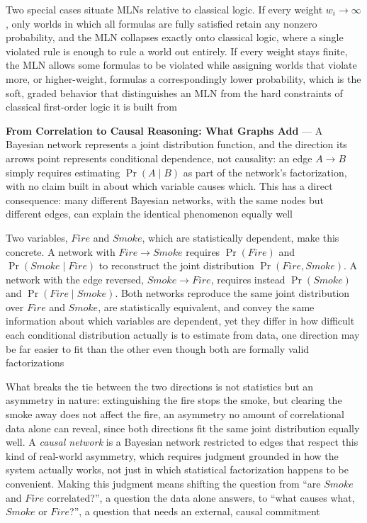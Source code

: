 Two special cases situate MLNs relative to classical logic. If every
weight $w_i \to \infty$, only worlds in which all formulas are fully
satisfied retain any nonzero probability, and the MLN collapses exactly
onto classical logic, where a single violated rule is enough to rule a
world out entirely. If every weight stays finite, the MLN allows some
formulas to be violated while assigning worlds that violate more, or
higher-weight, formulas a correspondingly lower probability, which is the
soft, graded behavior that distinguishes an MLN from the hard constraints
of classical first-order logic it is built from

\textbf{From Correlation to Causal Reasoning: What Graphs Add} --- A
Bayesian network represents a joint distribution function, and the
direction its arrows point represents conditional dependence, not
causality: an edge $A \to B$ simply requires estimating $\Pr(A \mid B)$ as
part of the network's factorization, with no claim built in about which
variable causes which. This has a direct consequence: many different
Bayesian networks, with the same nodes but different edges, can explain
the identical phenomenon equally well

Two variables, $Fire$ and $Smoke$, which are statistically dependent, make
this concrete. A network with $Fire \to Smoke$ requires $\Pr(Fire)$ and
$\Pr(Smoke \mid Fire)$ to reconstruct the joint distribution $\Pr(Fire,
Smoke)$. A network with the edge reversed, $Smoke \to Fire$, requires
instead $\Pr(Smoke)$ and $\Pr(Fire \mid Smoke)$. Both networks reproduce
the same joint distribution over $Fire$ and $Smoke$, are statistically
equivalent, and convey the same information about which variables are
dependent, yet they differ in how difficult each conditional distribution
actually is to estimate from data, one direction may be far easier to fit
than the other even though both are formally valid factorizations

What breaks the tie between the two directions is not statistics but an
asymmetry in nature: extinguishing the fire stops the smoke, but clearing
the smoke away does not affect the fire, an asymmetry no amount of
correlational data alone can reveal, since both directions fit the same
joint distribution equally well. A \emph{causal network} is a Bayesian
network restricted to edges that respect this kind of real-world asymmetry,
which requires judgment grounded in how the system actually works, not
just in which statistical factorization happens to be convenient. Making
this judgment means shifting the question from ``are $Smoke$ and $Fire$
correlated?'', a question the data alone answers, to ``what causes what,
$Smoke$ or $Fire$?'', a question that needs an external, causal
commitment

